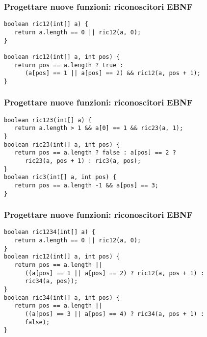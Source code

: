 \documentclass{beamer}
\begin{document}
\begin{frame}[fragile]
\frametitle{Progettare nuove funzioni: riconoscitori EBNF}
\begin{verbatim}
boolean ric12(int[] a) {
   return a.length == 0 || ric12(a, 0);
}

boolean ric12(int[] a, int pos) {
   return pos == a.length ? true : 
      (a[pos] == 1 || a[pos] == 2) && ric12(a, pos + 1);
}
\end{verbatim}
\end{frame}

\begin{frame}[fragile]
\frametitle{Progettare nuove funzioni: riconoscitori EBNF}
\begin{verbatim}
boolean ric123(int[] a) {
   return a.length > 1 && a[0] == 1 && ric23(a, 1);
}
boolean ric23(int[] a, int pos) {
   return pos == a.length ? false : a[pos] == 2 ?
      ric23(a, pos + 1) : ric3(a, pos);
}
boolean ric3(int[] a, int pos) {
   return pos == a.length -1 && a[pos] == 3;
}
\end{verbatim}
\end{frame}

\begin{frame}[fragile]
\frametitle{Progettare nuove funzioni: riconoscitori EBNF}
\begin{verbatim}
boolean ric1234(int[] a) {
   return a.length == 0 || ric12(a, 0);
}
boolean ric12(int[] a, int pos) {
   return pos == a.length ||
      ((a[pos] == 1 || a[pos] == 2) ? ric12(a, pos + 1) :
      ric34(a, pos));
}
boolean ric34(int[] a, int pos) {
   return pos == a.length ||
      ((a[pos] == 3 || a[pos] == 4) ? ric34(a, pos + 1) :
      false);
}
\end{verbatim}
\end{frame}

% 
% 
\end{document}
